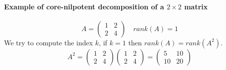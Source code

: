 \paragraph{Example of core-nilpotent decomposition of a $2 \times 2$ matrix}
\[
A = \begin{pmatrix}
1 & 2 \\
2 & 4
\end{pmatrix} \quad rank(A) = 1
\]
We try to compute the index $k$, if $k = 1$ then $rank(A) = rank(A^2)$.
\[
A^2 = \begin{pmatrix}
1 & 2 \\
2 & 4
\end{pmatrix} \begin{pmatrix}
1 & 2 \\
2 & 4
\end{pmatrix} = \begin{pmatrix}
5 & 10 \\
10 & 20
\end{pmatrix}
\]

